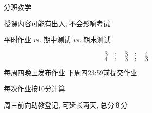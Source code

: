 
\begin{frame}{}
  \begin{center}
    分班教学

    {\large 授课内容可能有出入, 不会影响考试}
  \end{center}
\end{frame}

\begin{frame}{}
  \begin{center}
    {\large 平时作业 {\it vs.} 期中测试 {\it vs.} 期末测试}

    \[
      3 \quad:\quad 3 \quad:\quad 4
    \]
    \[
      4 \quad:\quad 3 \quad:\quad 3
    \]

    \vspace{0.80cm}
  \end{center}
\end{frame}

\begin{frame}{}
\end{frame}

\begin{frame}{}
  \begin{center}
    每周四晚上发布作业 \qquad 下周四23:59前提交作业

    \vspace{1.00cm}
    每次作业按10分计算

    \vspace{0.50cm}
     周三前向助教登记, 可延长两天, 总分８分
  \end{center}
\end{frame}

\begin{frame}{}
  \begin{center}
  \end{center}
\end{frame}

\begin{frame}{}
  \begin{center}

    \pause
    \vspace{0.60cm}
  \end{center}
\end{frame}

